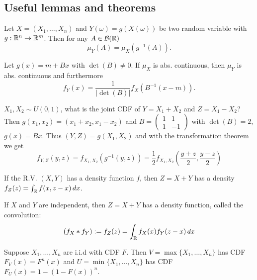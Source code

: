 \pagebreak
\subsection{Useful lemmas and theorems}

\begin{definition*}
  Let \(X = (X_1, \ldots, X_n)\) and \(Y(\omega) = g(X(\omega))\) be two random variable with \(g: \mathbb{R}^n \to \mathbb{R}^m\). Then for any \(A \in \mathcal{B}(\mathbb{R})\)
  \[\mu_Y(A) = \mu_X(g^{-1}(A)).\]
\end{definition*}

\begin{theorem*}
  Let \(g(x) = m + Bx\) with \(\det(B) \neq 0\). If \(\mu_X\) is abs. continuous, then \(\mu_Y\) is abs. continuous and furthermore
  \[f_Y(x) = \frac{1}{|\det(B)|} f_X(B^{-1}(x - m)).\]
\end{theorem*}

\begin{example}
  \(X_1, X_2 \sim U(0, 1)\), what is the joint CDF of \(Y = X_1 + X_2\) and \(Z = X_1 - X_2\)? \\
  Then \(g(x_1, x_2) = (x_1 + x_2, x_1 - x_2)\) and \(B = \begin{pmatrix}
    1 & 1 \\
    1 & -1
  \end{pmatrix}\) with \(\det (B) = 2\), \(g(x) = Bx\). Thus \((Y, Z) = g(X_1, X_2)\) and with the transformation theorem we get
  \[f_{Y, Z}(y, z) = f_{X_1, X_2}(g^{-1}(y, z)) = \frac{1}{2}f_{X_1, X_2}\left(\frac{y+z}{2}, \frac{y-z}{2}\right)\]
\end{example}

\begin{proposition}
  If the R.V. \((X, Y)\) has a density function \(f\), then \(Z = X + Y\) has a density 
  \(f_Z(z) = \int_{\mathbb{R}} f(x, z - x) \, dx\).
\end{proposition}

\begin{definition*}[Convolution]
  If \(X\) and \(Y\) are independent, then \(Z = X + Y\) has a density function, called the convolution:
  \[(f_X * f_Y) := f_Z(z) = \int_{\mathbb{R}} f_X(x)f_Y(z - x) \, dx\]
\end{definition*}

\begin{proposition}
  Suppose \(X_1, \ldots, X_n\) are i.i.d with CDF \(F\). Then \(V = \max\{X_1, \ldots, X_n\}\) has CDF \(F_V(x) = F^n(x)\) and
  \(U = \min \{X_1, \ldots, X_n\}\) has CDF \(F_U(x) = 1 - (1 - F(x))^n\).
\end{proposition}
